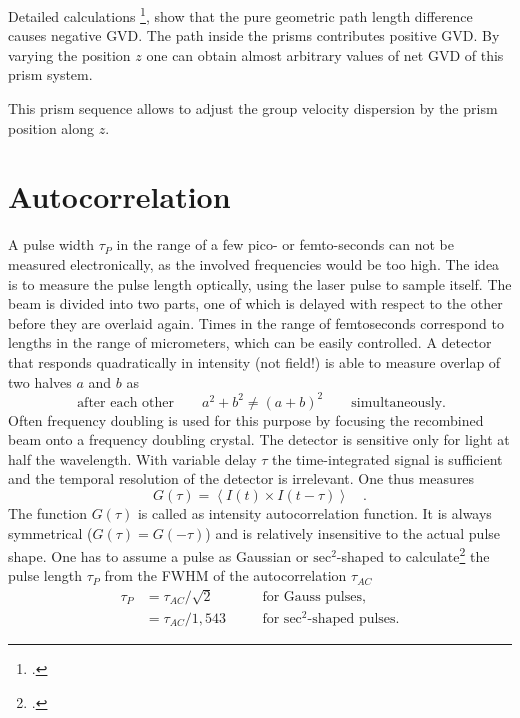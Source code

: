  Detailed calculations \footcite{DielsRudolph1996},
show that the pure geometric path length difference causes 
negative GVD. The path inside the prisms contributes  positive GVD.  By varying the position $z$ one can obtain almost arbitrary values of net GVD of this prism system.


\begin{marginfigure}
\center
   
\caption{This prism sequence allows to adjust the group velocity dispersion by the prism position along $z$. }
\label{fig_pulses_prism}
\end{marginfigure}

\section{Autocorrelation}

A pulse width $\tau_P$ in the range of a few pico- or femto-seconds can not be measured electronically, as the involved frequencies  would be too high. The idea is to measure the pulse length optically, using the  laser pulse to sample itself. The beam is divided into two parts, one of which is delayed with respect to the other before they are overlaid again.
 Times in the 
range of femtoseconds correspond to lengths in the range of
micrometers, which can be easily controlled. A detector that responds quadratically in intensity (not field!) is able to measure  overlap of two halves $a$ and $b$ as
\begin{equation}
 \ \text{after each other} \qquad a^2 + b^2 \neq (a+b)^2 \qquad
 \text{simultaneously.}
\end{equation}
Often  frequency doubling is used for this purpose by focusing the
recombined beam onto a frequency doubling crystal.
The detector is sensitive only for light at half the wavelength. With variable delay $\tau$ the time-integrated signal is sufficient and  the temporal resolution
of the detector is  irrelevant. One thus measures
\begin{equation}
  G(\tau) = \left< I(t) \times I(t-\tau) \right> \quad.
\end{equation}
The function $G(\tau)$ is called as intensity autocorrelation function. It is always symmetrical ($G(\tau) = G(-\tau)$) and
is relatively insensitive to the actual pulse shape.  One has to assume a pulse as Gaussian
 or
$\text{sec}^2$-shaped to calculate\footcite{DielsRudolph1996} the pulse length $\tau_{P} $ from the 
FWHM of the autocorrelation
$\tau_{AC}$ 
\begin{align}
  \tau_{P} &= \tau_{AC} / \sqrt{2} &\quad& \text{for Gauss pulses,} \\
           &= \tau_{AC} / 1,543 && \text{for $\text{sec}^2$-shaped pulses.}
\end{align}

